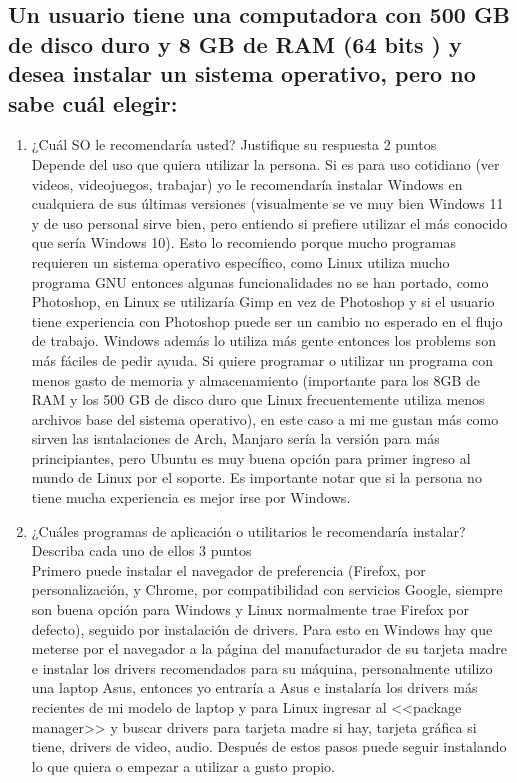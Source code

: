 \documentclass[stu, 12pt, letterpaper, donotrepeattitle, floatsintext, natbib, helv]{apa7}
\begin{document}
\subsection*{Un usuario tiene una computadora con 500 GB de disco duro y 8 GB de RAM (64 bits ) y desea instalar un sistema operativo, pero no sabe cuál elegir:}
{}
\begin{enumerate}
    \item ¿Cuál SO le recomendaría usted? Justifique su respuesta 2 puntos \\
    \quad Depende del uso que quiera utilizar la persona. Si es para uso cotidiano (ver videos, videojuegos, trabajar) yo le recomendaría instalar Windows en cualquiera de sus últimas versiones (visualmente se ve muy bien Windows 11 y de uso personal sirve bien, pero entiendo si prefiere utilizar el más conocido que sería Windows 10). Esto lo recomiendo porque mucho programas requieren un sistema operativo específico, como Linux utiliza mucho programa GNU entonces algunas funcionalidades no se han portado, como Photoshop, en Linux se utilizaría Gimp en vez de Photoshop y si el usuario tiene experiencia con Photoshop puede ser un cambio no esperado en el flujo de trabajo. Windows además lo utiliza más gente entonces los problems son más fáciles de pedir ayuda. Si quiere programar o utilizar un programa con menos gasto de memoria y almacenamiento (importante para los 8GB de RAM y los 500 GB de disco duro que Linux frecuentemente utiliza menos archivos base del sistema operativo), en este caso a mi me gustan más como sirven las isntalaciones de Arch, Manjaro sería la versión para más principiantes, pero Ubuntu es muy buena opción para primer ingreso al mundo de Linux por el soporte. Es importante notar que si la persona no tiene mucha experiencia es mejor irse por Windows.

    \item ¿Cuáles programas de aplicación o utilitarios le recomendaría instalar? Describa cada uno de ellos 3 puntos \\
    \quad Primero puede instalar el navegador de preferencia (Firefox, por personalización, y Chrome, por compatibilidad con servicios Google, siempre son buena opción para Windows y Linux normalmente trae Firefox por defecto), seguido por instalación de drivers. Para esto en Windows hay que meterse por el navegador a la página del manufacturador de su tarjeta madre e instalar los drivers recomendados para su máquina, personalmente utilizo una laptop Asus, entonces yo entraría a Asus e instalaría los drivers más recientes de mi modelo de laptop y para Linux ingresar al <<package manager>> y buscar drivers para tarjeta madre si hay, tarjeta gráfica si tiene, drivers de video, audio. Después de estos pasos puede seguir instalando lo que quiera o empezar a utilizar a gusto propio.
\end{enumerate}
\end{document}
